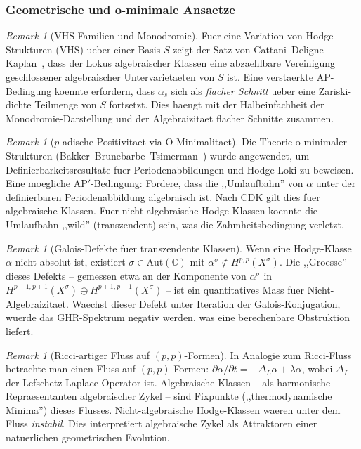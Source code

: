 \documentclass[aps,prd,twocolumn,superscriptaddress,nofootinbib]{revtex4-2}
\theoremstyle{definition}
\theoremstyle{remark}
\newtheorem{remark}[theorem]{Remark}
\begin{document}
\subsubsection{Geometrische und o-minimale Ansaetze}

\begin{remark}[VHS-Familien und Monodromie]
\label{rem:vhs-monodromy}
Fuer eine Variation von Hodge-Strukturen (VHS) ueber einer Basis $S$ zeigt der Satz von Cattani--Deligne--Kaplan~\cite{CattaniDeligneKaplan1995}, dass der Lokus algebraischer Klassen eine abzaehlbare Vereinigung geschlossener algebraischer Untervarietaeten von $S$ ist. Eine verstaerkte AP-Bedingung koennte erfordern, dass $\alpha_s$ sich als \textit{flacher Schnitt} ueber eine Zariski-dichte Teilmenge von $S$ fortsetzt. Dies haengt mit der Halbeinfachheit der Monodromie-Darstellung und der Algebraizitaet flacher Schnitte zusammen.
\end{remark}

\begin{remark}[$p$-adische Positivitaet via O-Minimalitaet]
\label{rem:o-minimality}
Die Theorie o-minimaler Strukturen (Bakker--Brunebarbe--Tsimerman~\cite{BBT2020}) wurde angewendet, um Definierbarkeitsresultate fuer Periodenabbildungen und Hodge-Loki zu beweisen. Eine moegliche AP$'$-Bedingung: Fordere, dass die ,,Umlaufbahn'' von $\alpha$ unter der definierbaren Periodenabbildung algebraisch ist. Nach CDK gilt dies fuer algebraische Klassen. Fuer nicht-algebraische Hodge-Klassen koennte die Umlaufbahn ,,wild'' (transzendent) sein, was die Zahmheitsbedingung verletzt.
\end{remark}

\begin{remark}[Galois-Defekte fuer transzendente Klassen]
\label{rem:galois-defects}
Wenn eine Hodge-Klasse $\alpha$ nicht absolut ist, existiert $\sigma \in \mathrm{Aut}(\mathbb{C})$ mit $\alpha^\sigma \notin H^{p,p}(X^\sigma)$. Die ,,Groesse'' dieses Defekts -- gemessen etwa an der Komponente von $\alpha^\sigma$ in $H^{p-1,p+1}(X^\sigma) \oplus H^{p+1,p-1}(X^\sigma)$ -- ist ein quantitatives Mass fuer Nicht-Algebraizitaet. Waechst dieser Defekt unter Iteration der Galois-Konjugation, wuerde das GHR-Spektrum negativ werden, was eine berechenbare Obstruktion liefert.
\end{remark}

\begin{remark}[Ricci-artiger Fluss auf $(p,p)$-Formen]
\label{rem:ricci-flow}
In Analogie zum Ricci-Fluss betrachte man einen Fluss auf $(p,p)$-Formen:
$\partial \alpha / \partial t = -\Delta_L \alpha + \lambda \alpha$,
wobei $\Delta_L$ der Lefschetz-Laplace-Operator ist. Algebraische Klassen -- als harmonische Repraesentanten algebraischer Zykel -- sind Fixpunkte (,,thermodynamische Minima'') dieses Flusses. Nicht-algebraische Hodge-Klassen waeren unter dem Fluss \textit{instabil}. Dies interpretiert algebraische Zykel als Attraktoren einer natuerlichen geometrischen Evolution.
\end{remark}
\end{document}
